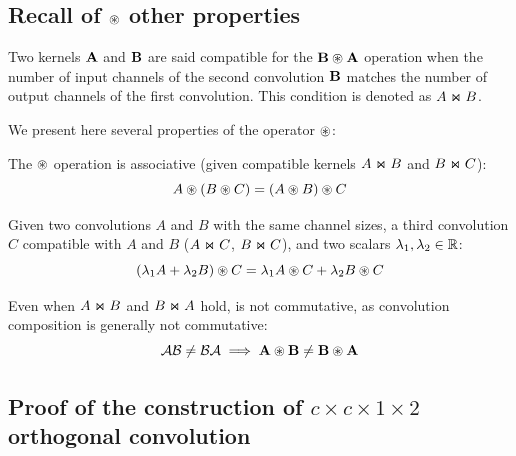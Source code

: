     \subsection{Recall of $\circledast$ other properties}
Two kernels $\mathbf{A}$ and $\mathbf{B}$ are said compatible for the $\mathbf{B}\circledast\mathbf{A}$ operation when the number of input channels of the second convolution $\mathbf{B}$ matches the number of output channels of the first convolution. This condition is denoted as $A\Join B$.

We present here several properties of the  \Bconv{} operator  $\circledast$: 
    
        \begin{proposition}[Associativity]\label{prop:associativity} The $\circledast$ operation is associative (given compatible kernels $A\Join B$ and $B\Join C$): 
            \[ A \circledast (B \circledast C) = (A \circledast B) \circledast C \]
            
        \end{proposition}
        
        \begin{proposition}[Bi-linearity]\label{prop:bilinear} Given two convolutions $A$ and $B$ with the same channel sizes, a third convolution $C$ compatible with $A$ and $B$ ($A\Join C$, $B\Join C$), and two scalars $\lambda_1, \lambda_2 \in \mathbb{R}$:
            \[ (\lambda_1 A + \lambda_2 B) \circledast C = \lambda_1 A \circledast C +  \lambda_2 B \circledast C 
            \]
        \end{proposition}
        
        \begin{proposition} Even when $A\Join B$ and $B\Join A$ hold, \Bconv{} is not commutative, as convolution composition is generally not commutative:
        \[
            \mathcal{A} \mathcal{B} \neq \mathcal{B} \mathcal{A} \implies \mathbf{A} \circledast \mathbf{B} \neq \mathbf{B} \circledast \mathbf{A} 
        \]
        \end{proposition}

    \subsection{Proof of the construction of $c\times c \times 1 \times 2$ orthogonal convolution}\label{sec:ap_1x2_ortho}

